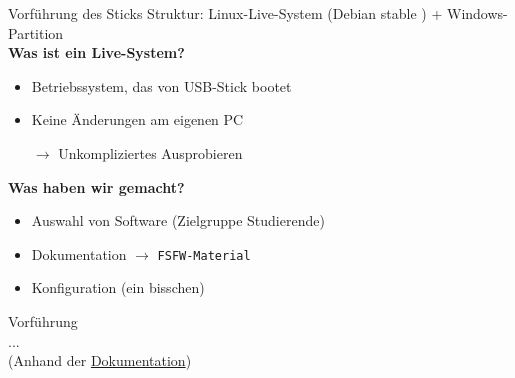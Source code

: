 \documentclass[t]{beamer}
\begin{document}

\begin{frame}[label=ct3]{\color{fg}Vorführung des Sticks}
Struktur: Linux-Live-System (Debian stable ) + Windows-Partition\\[3mm]

\textbf{Was ist ein Live-System?}
\begin{itemize}
  \item Betriebssystem, das von USB-Stick bootet
  \item[]
  \item Keine Änderungen am eigenen PC
  \item[$\rightarrow$] Unkompliziertes Ausprobieren
  \item[]
  \end{itemize}

\pause  
\textbf{Was haben wir gemacht?}
  \begin{itemize}
  \item Auswahl von Software (Zielgruppe Studierende)
  \item Dokumentation $\rightarrow$ \texttt{FSFW-Material}
  \item Konfiguration (ein bisschen)
  \end{itemize}  
 
\end{frame}




\begin{frame}[label=ct4]{\color{fg}{}}
 \vspace{20mm}

\begin{center}
Vorführung\\ ... \\[10mm]

{\tiny (Anhand der \href{https://github.com/fsfw-dresden/usb-live-linux/blob/master/doc/src/index.md}{Dokumentation})}



\end{center}
\end{frame}

\end{document}
